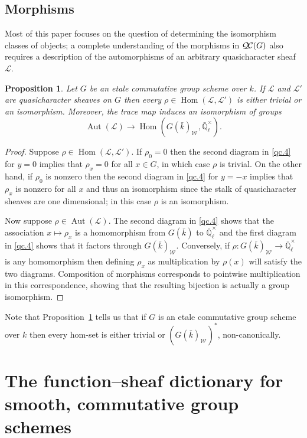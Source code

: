 \documentclass{amsart}
\theoremstyle{plain}
\newtheorem{proposition}[theorem]{Proposition}
\theoremstyle{definition}
\theoremstyle{remark}
\newcommand{\EE}{\mathbb{\bar Q}_\ell}
\newcommand{\bFq}{\bar{k}}
\newcommand{\Fq}{k}
\newcommand{\EEx}{\EE^\times}
\newcommand{\Weil}[1]{\mathcal{W}_{#1}}
\DeclareMathOperator{\Aut}{Aut}
\DeclareMathOperator{\Hom}{Hom}
\newcommand{\qcs}[1]{{\mathcal{#1}}}
\newcommand{\QC}{{\mathcal{Q\hskip-0.8pt C}}}
\begin{document}
\subsection{Morphisms}\label{sec:mor-etale}

Most of this paper focuses on the question of determining the isomorphism classes of objects; a complete understanding of the morphisms in $\QC(G)$ also requires a description of the automorphisms of an arbitrary quasicharacter sheaf $\qcs{L}$.

\begin{proposition}\label{prop:autornaught_etale}
Let $G$ be an etale commutative group scheme over $\Fq$.
If $\qcs{L}$ and $\qcs{L}'$ are quasicharacter sheaves on $G$ then
every $\rho\in \Hom(\qcs{L},\qcs{L}')$ is either trivial or an isomorphism. Moreover, the trace map induces an isomorphism of groups
\[
\Aut(\qcs{L}) \to \Hom(G(\bFq)_{\Weil{}}, \EEx).
\]
\end{proposition}

\begin{proof}
Suppose $\rho \in \Hom(\qcs{L},\qcs{L}')$.
If $\rho_0 = 0$ then the second diagram in \ref{qc.4} for $y=0$ implies that $\rho_x = 0$ for all $x\in G$, in which case $\rho$ is trivial.
On the other hand, if $\rho_0$ is nonzero then the second diagram in \ref{qc.4} for $y = -x$ implies that $\rho_x$ is nonzero for all $x$ and thus an isomorphism since the stalk of quasicharacter sheaves are one dimensional; in this case $\rho$ is an isomorphism.

Now suppose $\rho \in \Aut(\qcs{L})$.
The second diagram in \ref{qc.4} shows that the association $x \mapsto \rho_x$ is a homomorphism from $G(\bFq)$ to $\EEx$ and the first diagram in \ref{qc.4} shows that it factors through $G(\bFq)_{\Weil{}}$.  Conversely, if $\rho : G(\bFq)_{\Weil{}} \to \EEx$ is any homomorphism then defining $\rho_x$ as multiplication by $\rho(x)$ will satisfy the two diagrams.  Composition of morphisms corresponds to pointwise multiplication in this correspondence, showing that the resulting bijection is actually a group isomorphism.
\end{proof}

Note that Proposition~\ref{prop:autornaught_etale} tells us that if $G$ is an etale commutative group scheme over $\Fq$ then every hom-set is either trivial or $\left(G(\bFq)_{\Weil{}}\right)^*$, non-canonically.

\section{The function--sheaf dictionary for smooth, commutative group schemes}\label{sec:main}
\end{document}
